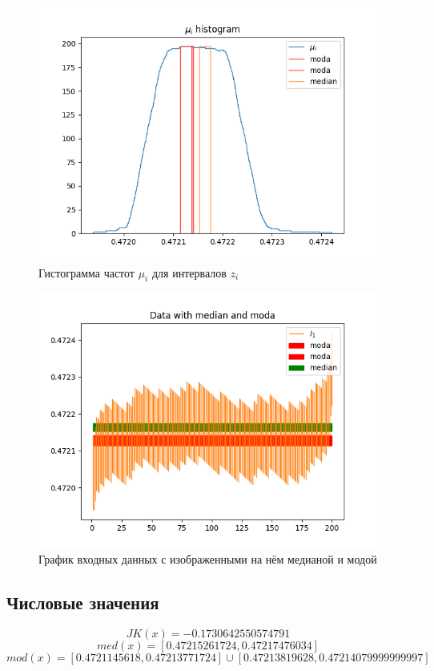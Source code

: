 \documentclass[a4paper,12pt]{article}
\begin{document}
\begin{figure}[H]
    \centering
    \includegraphics[width=12cm]{pics/mu_hist.png}
    \caption{Гистограмма частот $\mu_i$ для интервалов $z_i$}
    \label{fig:mu_hist}
\end{figure}

\begin{figure}[H]
    \centering
    \includegraphics[width=12cm]{pics/data_med_mod.png}
    \caption{График входных данных с изображенными на нём медианой и модой}
    \label{fig:med_mod}
\end{figure}

\subsection{Числовые значения}
$$JK(x) = -0.1730642550574791$$
$$med(x) = [0.47215261724, 0.47217476034]$$
$$mod(x) = [0.4721145618, 0.47213771724] \cup [0.47213819628, 0.47214079999999997]$$
\end{document}
